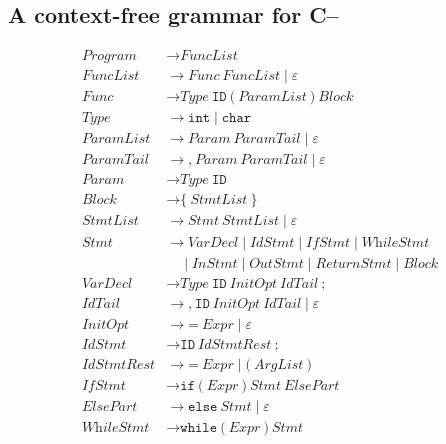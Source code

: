 \documentclass[11pt]{article}
\begin{document}
\subsection{A context-free grammar for \textsf{C--}}
\begin{align*}
\textit{Program}    &\to \textit{FuncList}\\
\textit{FuncList}   &\to \textit{Func}\ \textit{FuncList} \mid \varepsilon\\
\textit{Func}       &\to \textit{Type}\ \texttt{ID}\ \texttt{(}\ \textit{ParamList}\ \texttt{)}\ \textit{Block}\\
\textit{Type}       &\to \texttt{int} \mid \texttt{char}\\
\textit{ParamList}  &\to \textit{Param}\ \textit{ParamTail} \mid \varepsilon\\
\textit{ParamTail}  &\to \texttt{,}\ \textit{Param}\ \textit{ParamTail} \mid \varepsilon\\
\textit{Param}      &\to \textit{Type}\ \texttt{ID}\\
\textit{Block}      &\to \texttt{\{}\ \textit{StmtList}\ \texttt{\}}\\
\textit{StmtList}   &\to \textit{Stmt}\ \textit{StmtList} \mid \varepsilon\\
\textit{Stmt}       &\to \textit{VarDecl} \mid \textit{IdStmt} \mid \textit{IfStmt} \mid \textit{WhileStmt}\\
                    &\quad\mid \textit{InStmt} \mid \textit{OutStmt} \mid \textit{ReturnStmt} \mid \textit{Block}\\
\textit{VarDecl}    &\to \textit{Type}\ \texttt{ID}\ \textit{InitOpt}\ \textit{IdTail}\ \texttt{;}\\
\textit{IdTail}     &\to \texttt{,}\ \texttt{ID}\ \textit{InitOpt}\ \textit{IdTail} \mid \varepsilon\\
\textit{InitOpt}    &\to \texttt{=}\ \textit{Expr} \mid \varepsilon\\
\textit{IdStmt}     &\to \texttt{ID}\ \textit{IdStmtRest}\ \texttt{;}\\
\textit{IdStmtRest} &\to \texttt{=}\ \textit{Expr} \mid \texttt{(}\ \textit{ArgList}\ \texttt{)}\\
\textit{IfStmt}     &\to \texttt{if}\ \texttt{(}\ \textit{Expr}\ \texttt{)}\ \textit{Stmt}\ \textit{ElsePart}\\
\textit{ElsePart}   &\to \texttt{else}\ \textit{Stmt} \mid \varepsilon\\
\textit{WhileStmt}  &\to \texttt{while}\ \texttt{(}\ \textit{Expr}\ \texttt{)}\ \textit{Stmt}\\

\end{align*}
\end{document}
